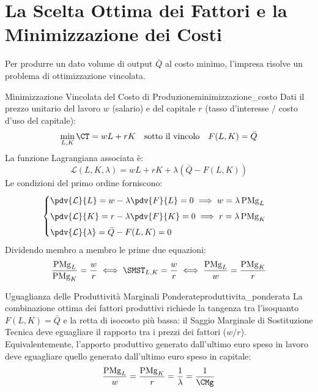 \section{La Scelta Ottima dei Fattori e la Minimizzazione dei Costi}

Per produrre un dato volume di output $\bar{Q}$ al costo minimo, l'impresa risolve un problema di ottimizzazione vincolata.

\begin{modello}{Minimizzazione Vincolata del Costo di Produzione}{minimizzazione_costo}
Dati il prezzo unitario del lavoro $w$ (salario) e del capitale $r$ (tasso d'interesse / costo d'uso del capitale):
\begin{equation}
    \min_{L, K} \CT = wL + rK \quad \text{sotto il vincolo} \quad F(L, K) = \bar{Q}
\end{equation}
La funzione Lagrangiana associata è:
\begin{equation}
    \mathcal{L}(L, K, \lambda) = wL + rK + \lambda(\bar{Q} - F(L, K))
\end{equation}
Le condizioni del primo ordine forniscono:
\begin{equation}
    \begin{cases}
        \pdv{\mathcal{L}}{L} = w - \lambda \pdv{F}{L} = 0 \implies w = \lambda \, \mathrm{PMg}_L \\[1ex]
        \pdv{\mathcal{L}}{K} = r - \lambda \pdv{F}{K} = 0 \implies r = \lambda \, \mathrm{PMg}_K \\[1ex]
        \pdv{\mathcal{L}}{\lambda} = \bar{Q} - F(L, K) = 0
    \end{cases}
\end{equation}
Dividendo membro a membro le prime due equazioni:
\begin{equation}
    \frac{\mathrm{PMg}_L}{\mathrm{PMg}_K} = \frac{w}{r} \iff \SMST_{L, K} = \frac{w}{r} \iff \frac{\mathrm{PMg}_L}{w} = \frac{\mathrm{PMg}_K}{r}
    \label{eq:ottimo_fattori}
\end{equation}
\end{modello}

\begin{teorema}{Uguaglianza delle Produttività Marginali Ponderate}{produttivita_ponderata}
La combinazione ottima dei fattori produttivi richiede la tangenza tra l'isoquanto $F(L, K) = \bar{Q}$ e la retta di isocosto più bassa: il Saggio Marginale di Sostituzione Tecnica deve eguagliare il rapporto tra i prezzi dei fattori ($w/r$). Equivalentemente, l'apporto produttivo generato dall'ultimo euro speso in lavoro deve eguagliare quello generato dall'ultimo euro speso in capitale:
\begin{equation}
    \frac{\mathrm{PMg}_L}{w} = \frac{\mathrm{PMg}_K}{r} = \frac{1}{\lambda} = \frac{1}{\CMg}
\end{equation}
\end{teorema}

